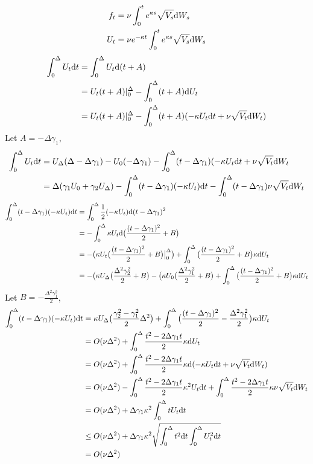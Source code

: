 \documentclass{ws-ijfe}
\begin{document}
\begin{align*}
  f_t & = \nu\int_{0}^{t}e^{\kappa s}\sqrt{V_s}\mathrm{d} W_s \\
  U_t & = \nu e^{-\kappa t}\int_{0}^{t}e^{\kappa s}\sqrt{V_s}\mathrm{d} W_s \\
\end{align*}
\begin{align*}
  \int_{0}^{\Delta}U_t\mathrm{d} t & = \int_{0}^{\Delta}U_t\mathrm{d} (t+A) \\
   & = U_t(t+A)|_0^{\Delta}-\int_{0}^{\Delta}(t+A)\mathrm{d} U_t \\
   & = U_t(t+A)|_0^{\Delta}-\int_{0}^{\Delta}(t+A)(-\kappa U_t\mathrm{d} t +\nu\sqrt{V_t}\mathrm{d} W_t)
\end{align*}
Let $A=-\Delta\gamma_1$,
\begin{align*}
  \int_{0}^{\Delta}U_t\mathrm{d} t & = U_{\Delta}(\Delta-\Delta\gamma_1)-U_{0}(-\Delta\gamma_1)-\int_{0}^{\Delta}(t-\Delta\gamma_1)(-\kappa U_t\mathrm{d} t +\nu\sqrt{V_t}\mathrm{d} W_t \\
   & = \Delta(\gamma_1U_0+\gamma_2 U_{\Delta})-\int_{0}^{\Delta}(t-\Delta\gamma_1)(-\kappa U_t)\mathrm{d} t-\int_{0}^{\Delta}(t-\Delta\gamma_1)\nu\sqrt{V_t}\mathrm{d} W_t
\end{align*}
\begin{align*}
   \int_{0}^{\Delta}(t-\Delta\gamma_1)(-\kappa U_t)\mathrm{d} t &= \int_{0}^{\Delta}\frac{1}{2}(-\kappa U_t)\mathrm{d} (t-\Delta\gamma_1)^2\\
   &= -\int_{0}^{\Delta}\kappa U_t\mathrm{d} \big(\frac{(t-\Delta\gamma_1)^2}{2}+B\big)\\
   &=-\big(\kappa U_{t}\big(\frac{(t-\Delta\gamma_1)^2}{2}+B\big)\big|_0^{\Delta}\big)+\int_{0}^{\Delta}\big(\frac{(t-\Delta\gamma_1)^2}{2}+B\big)\kappa \mathrm{d} U_t\\
   &=-\big(\kappa U_{\Delta}\big(\frac{\Delta^2\gamma_2^2}{2}+B\big)-\big(\kappa U_{0}\big(\frac{\Delta^2\gamma_1^2}{2}+B\big)+\int_{0}^{\Delta}\big(\frac{(t-\Delta\gamma_1)^2}{2}+B\big)\kappa \mathrm{d} U_t
\end{align*}
Let $B=-\frac{\Delta^2\gamma_1^2}{2}$,
\begin{align*}
   \int_{0}^{\Delta}(t-\Delta\gamma_1)(-\kappa U_t)\mathrm{d} t &= \kappa U_{\Delta}\big(\frac{\gamma_2^2-\gamma_1^2}{2}\Delta^2\big)+ \int_{0}^{\Delta}\big(\frac{(t-\Delta\gamma_1)^2}{2}-\frac{\Delta^2\gamma_1^2}{2}\big)\kappa \mathrm{d} U_t\\
   &=O(\nu\Delta^2)+\int_{0}^{\Delta}\frac{t^2-2\Delta\gamma_1t}{2}\kappa \mathrm{d} U_t\\
   &=O(\nu\Delta^2)+\int_{0}^{\Delta}\frac{t^2-2\Delta\gamma_1t}{2}\kappa \mathrm{d} (-\kappa U_t\mathrm{d} t + \nu\sqrt{V_t}\mathrm{d} W_t)\\
   &=O(\nu\Delta^2)-\int_{0}^{\Delta}\frac{t^2-2\Delta\gamma_1t}{2}\kappa^2U_t\mathrm{d} t+\int_{0}^{\Delta}\frac{t^2-2\Delta\gamma_1t}{2}\kappa\nu\sqrt{V_t}\mathrm{d} W_t\\
   &=O(\nu\Delta^2)+\Delta\gamma_1\kappa^2\int_{0}^{\Delta}tU_t\mathrm{d} t\\
   &\leq O(\nu\Delta^2)+\Delta\gamma_1\kappa^2\sqrt{\int_{0}^{\Delta}t^2\mathrm{d} t\int_{0}^{\Delta}U_t^2\mathrm{d} t}\\
   &=O(\nu\Delta^2)
\end{align*}
\end{document}
